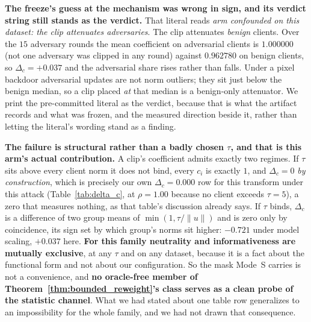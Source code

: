 \documentclass{article}
\begin{document}
\textbf{The freeze's guess at the mechanism was wrong in sign, and its verdict string still stands as the verdict.} That literal reads \emph{arm confounded on this dataset: the clip attenuates adversaries}. The clip attenuates \emph{benign} clients. Over the $15$ adversary rounds the mean coefficient on adversarial clients is $1.000000$ (not one adversary was clipped in any round) against $0.962780$ on benign clients, so $\Delta_c = {+}0.037$ and the adversarial share rises rather than falls. Under a pixel backdoor adversarial updates are not norm outliers; they sit just below the benign median, so a clip placed \emph{at} that median is a benign-only attenuator. We print the pre-committed literal as the verdict, because that is what the artifact records and what was frozen, and the measured direction beside it, rather than letting the literal's wording stand as a finding.

\textbf{The failure is structural rather than a badly chosen $\tau$, and that is this arm's actual contribution.} A clip's coefficient admits exactly two regimes. If $\tau$ sits above every client norm it does not bind, every $c_i$ is exactly $1$, and $\Delta_c=0$ \emph{by construction}, which is precisely our own $\Delta_c=0.000$ row for this transform under this attack (Table~\ref{tab:delta_c}, at $\rho=1.00$ because no client exceeds $\tau{=}5$), a zero that measures nothing, as that table's discussion already says. If $\tau$ binds, $\Delta_c$ is a difference of two group means of $\min(1,\tau/\lVert u\rVert)$ and is zero only by coincidence, its sign set by which group's norms sit higher: ${-}0.721$ under model scaling, ${+}0.037$ here. \textbf{For this family neutrality and informativeness are mutually exclusive}, at any $\tau$ and on any dataset, because it is a fact about the functional form and not about our configuration. So the mask Mode~S carries is not a convenience, and \textbf{no oracle-free member of Theorem~\ref{thm:bounded_reweight}'s class serves as a clean probe of the statistic channel}. What we had stated about one table row generalizes to an impossibility for the whole family, and we had not drawn that consequence.
\end{document}
